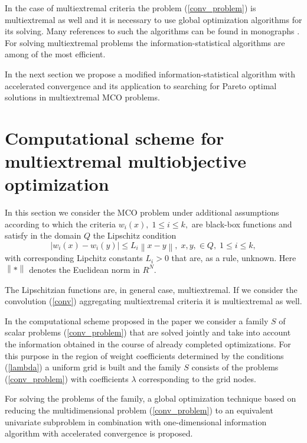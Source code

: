\documentclass[runningheads]{llncs}
\begin{document}
In the case of multiextremal criteria the problem (\ref{conv_problem}) is multiextremal as well and it is necessary to use global optimization algorithms for its solving. Many references to such the algorithms can be found in monographs \cite{Strongin2000,Pinter1996,Zhigljavsky2008,Sergeyev2013,PaulaviciusZilinskas2014,Sergeyev2017}. For solving multiextremal problems the information-statistical algorithms \cite{Strongin2000,Sergeyev2013} are among of the most efficient.

In the next section we propose a modified information-statistical algorithm with accelerated convergence and its application to searching for Pareto optimal solutions in multiextremal MCO problems.

\section{Computational scheme for multiextremal multiobjective optimization}

In this section we consider the MCO problem under additional assumptions according to which the criteria $w_i(x), \; 1 \leq i \leq k,$ are black-box functions and satisfy in the domain $Q$ the Lipschitz condition
\begin{equation}\label{lip}
\left| w_i(x) - w_i(y)\right| \leq L_i \left\| x-y \right\|, \; x,y, \in Q, \; 1 \leq i \leq k,
\end{equation}
with corresponding Lipchitz constants $L_i > 0$ that are, as a rule, unknown. Here $\left\|*\right\|$   denotes the Euclidean norm in $R^N$.

The Lipschitzian functions are, in general case, multiextremal. If we consider the convolution (\ref{conv}) aggregating multiextremal criteria it is multiextremal as well.

In the computational scheme proposed in the paper we consider a family $S$ of scalar problems (\ref{conv_problem}) that are solved jointly and take into account the information obtained in the course of already completed optimizations. For this purpose in the region of weight coefficients determined by the conditions (\ref{lambda}) a uniform grid is built and the family $S$ consists of the problems (\ref{conv_problem}) with coefficients $\lambda$ corresponding to the grid nodes.

For solving the problems of the family, a global optimization technique based on reducing the multidimensional problem (\ref{conv_problem}) to an equivalent univariate subproblem \cite{Strongin2000,Pinter1996,Zhigljavsky2008,Sergeyev2013,PaulaviciusZilinskas2014,Sergeyev2017} in combination with one-dimensional information algorithm with accelerated convergence is proposed.
\end{document}

